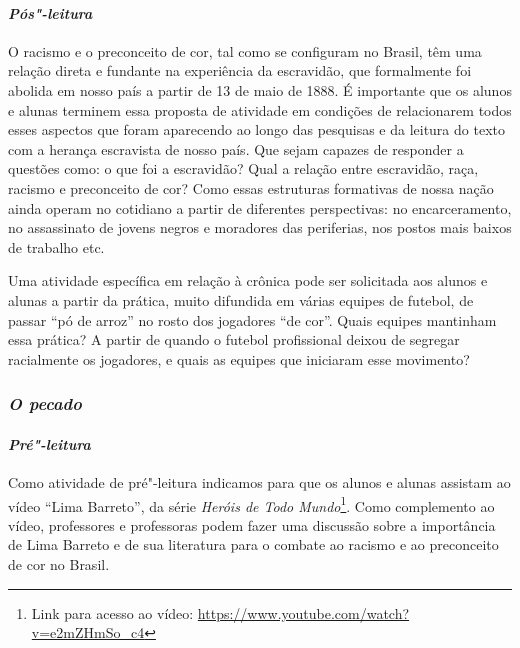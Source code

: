 \documentclass[11pt]{extarticle}
\begin{document}


\paragraph{\textit{Pós"-leitura}}

O racismo e o preconceito de cor, tal como se configuram no Brasil,
têm uma relação direta e fundante na experiência da escravidão, que
formalmente foi abolida em nosso país a partir de 13 de maio de 1888.
É importante que os alunos e alunas terminem essa proposta de atividade em
condições de relacionarem todos esses aspectos que foram aparecendo ao
longo das pesquisas e da leitura do texto com a herança escravista de
nosso país. Que sejam capazes de responder a questões como: o que foi a
escravidão? Qual a relação entre escravidão, raça, racismo e preconceito
de cor? Como essas estruturas formativas de nossa nação ainda operam no
cotidiano a partir de diferentes perspectivas: no encarceramento, no
assassinato de jovens negros e moradores das periferias, nos postos mais
baixos de trabalho etc.

Uma atividade específica em relação à crônica pode ser solicitada aos
alunos e alunas a partir da prática, muito difundida em várias equipes 
de futebol, de passar ``pó de arroz'' no rosto dos jogadores
``de cor''. Quais equipes mantinham essa prática? A partir de quando o
futebol profissional deixou de segregar racialmente os jogadores, e quais
as equipes que iniciaram esse movimento?


\subsubsection{\textit{O pecado}}

\paragraph{\textit{Pré"-leitura}}

Como atividade de pré"-leitura indicamos para que os alunos e alunas
assistam ao vídeo ``Lima Barreto'', da série \emph{Heróis de Todo
Mundo}\footnote{Link para acesso ao vídeo:
  \url{https://www.youtube.com/watch?v=e2mZHmSo_c4}}. Como complemento
ao vídeo, professores e professoras podem fazer uma discussão sobre a
importância de Lima Barreto e de sua literatura para o combate ao
racismo e ao preconceito de cor no Brasil.
\end{document}
